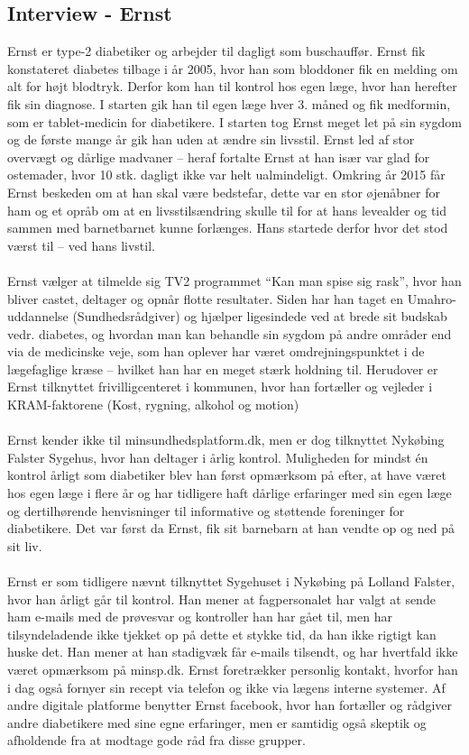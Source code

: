 \subsection{Interview - Ernst}
Ernst er type-2 diabetiker og arbejder til dagligt som buschauffør. Ernst fik konstateret diabetes tilbage i år 2005, hvor han som bloddoner fik en melding om alt for højt blodtryk. Derfor kom han  til kontrol hos egen læge, hvor han herefter fik sin diagnose.
I starten gik han til egen læge hver 3. måned og fik medformin, som er tablet-medicin for diabetikere. I starten tog Ernst meget let på sin sygdom og de første mange år gik han uden at ændre sin livsstil. Ernst led af stor overvægt og dårlige madvaner – heraf fortalte Ernst at han især var glad for ostemader, hvor 10 stk. dagligt ikke var helt ualmindeligt.
Omkring år 2015 får Ernst beskeden om at han skal være bedstefar, dette var en stor øjenåbner for ham og et opråb om at en livsstilsændring skulle til for at hans levealder og tid sammen med barnetbarnet kunne forlænges. Hans startede derfor hvor det stod værst til – ved hans livstil.
\\ \\
Ernst vælger at tilmelde sig TV2 programmet “Kan man spise sig rask”, hvor han bliver castet, deltager og opnår flotte resultater. Siden har han taget en Umahro-uddannelse (Sundhedsrådgiver) og hjælper ligesindede ved at brede sit budskab vedr. diabetes, og hvordan man kan behandle sin sygdom på andre områder end via de medicinske veje, som han oplever har været omdrejningspunktet i de lægefaglige kræse – hvilket han har en meget stærk holdning til. Herudover er Ernst tilknyttet frivilligcenteret i kommunen, hvor han fortæller og vejleder i KRAM-faktorene (Kost, rygning, alkohol og motion)
\\ \\
Ernst kender ikke til minsundhedsplatform.dk, men er dog tilknyttet Nykøbing Falster Sygehus, hvor han deltager i årlig kontrol. Muligheden for mindst én kontrol årligt som diabetiker blev han først opmærksom på efter, at have været hos egen læge i flere år og har tidligere haft dårlige erfaringer med sin egen læge og dertilhørende henvisninger til informative og støttende foreninger for diabetikere. Det var først da Ernst, fik sit barnebarn at han vendte op og ned på sit liv. 
\\ \\
Ernst er som tidligere nævnt tilknyttet Sygehuset i Nykøbing på Lolland Falster, hvor han årligt går til kontrol. Han mener at fagpersonalet har valgt at sende ham e-mails med de prøvesvar og kontroller han har gået til, men har tilsyndeladende ikke tjekket op på dette et stykke tid, da han ikke rigtigt kan huske det. Han mener at han stadigvæk får e-mails tilsendt, og har hvertfald ikke været opmærksom på minsp.dk. Ernst foretrækker personlig kontakt, hvorfor han i dag også fornyer sin recept via telefon og ikke via lægens interne systemer. Af andre digitale platforme benytter Ernst facebook, hvor han fortæller og rådgiver andre diabetikere med sine egne erfaringer, men er samtidig også skeptik og afholdende fra at modtage gode råd fra disse grupper.
